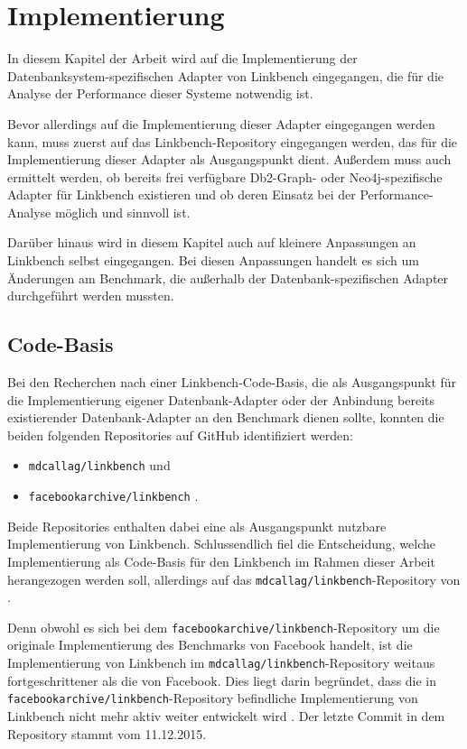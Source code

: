 \chapter{Implementierung}
\label{implementierung}
In diesem Kapitel der Arbeit wird auf die Implementierung der Datenbanksystem-spezifischen Adapter von Linkbench eingegangen, die für die Analyse der Performance dieser Systeme notwendig ist. 

Bevor allerdings auf die Implementierung dieser Adapter eingegangen werden kann, muss zuerst auf das Linkbench-Repository eingegangen werden, das für die Implementierung dieser Adapter als Ausgangspunkt dient. Außerdem muss auch ermittelt werden, ob bereits frei verfügbare Db2-Graph- oder Neo4j-spezifische Adapter für Linkbench existieren und ob deren Einsatz bei der Performance-Analyse möglich und sinnvoll ist.

Darüber hinaus wird in diesem Kapitel auch auf kleinere Anpassungen an Linkbench selbst eingegangen. Bei diesen Anpassungen handelt es sich um Änderungen am Benchmark, die außerhalb der Datenbank-spezifischen Adapter durchgeführt werden mussten.

\section{Code-Basis}
\label{implementierung:basis}
Bei den Recherchen nach einer Linkbench-Code-Basis, die als Ausgangspunkt für die Implementierung eigener Datenbank-Adapter oder der Anbindung bereits existierender Datenbank-Adapter an den Benchmark dienen sollte, konnten die beiden folgenden Repositories auf GitHub identifiziert werden:
\begin{itemize}
    \item \texttt{mdcallag/linkbench} \cite{mc_linkbench_github} und 
    \item \texttt{facebookarchive/linkbench} \cite{fb_linkbench_github}.
\end{itemize}
Beide Repositories enthalten dabei eine als Ausgangspunkt nutzbare Implementierung von Linkbench. Schlussendlich fiel die Entscheidung, welche Implementierung als Code-Basis für den Linkbench im Rahmen dieser Arbeit herangezogen werden soll, allerdings auf das \texttt{mdcallag/linkbench}-Repository von . 

Denn obwohl es sich bei dem \texttt{facebookarchive/linkbench}-Repository um die originale Implementierung des Benchmarks von Facebook handelt, ist die Implementierung von Linkbench im \texttt{mdcallag/linkbench}-Repository weitaus fortgeschrittener als die von Facebook. Dies liegt darin begründet, dass die in \texttt{facebookarchive\allowbreak /linkbench}-Repository befindliche Implementierung von Linkbench nicht mehr aktiv weiter entwickelt wird \cite{fb_linkbench_github}. Der letzte Commit in dem Repository stammt vom 11.12.2015. 

